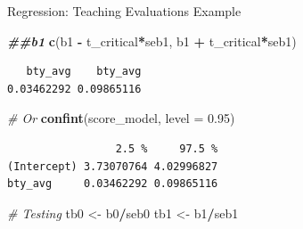 \documentclass[
  ignorenonframetext,
]{beamer}
\newenvironment{Shaded}{\begin{snugshade}}{\end{snugshade}}
\newcommand{\AttributeTok}[1]{\textcolor[rgb]{0.13,0.29,0.53}{#1}}
\newcommand{\CommentTok}[1]{\textcolor[rgb]{0.56,0.35,0.01}{\textit{#1}}}
\newcommand{\DocumentationTok}[1]{\textcolor[rgb]{0.56,0.35,0.01}{\textbf{\textit{#1}}}}
\newcommand{\FloatTok}[1]{\textcolor[rgb]{0.00,0.00,0.81}{#1}}
\newcommand{\FunctionTok}[1]{\textcolor[rgb]{0.13,0.29,0.53}{\textbf{#1}}}
\newcommand{\NormalTok}[1]{#1}
\newcommand{\OtherTok}[1]{\textcolor[rgb]{0.56,0.35,0.01}{#1}}
\newcommand{\SpecialCharTok}[1]{\textcolor[rgb]{0.81,0.36,0.00}{\textbf{#1}}}
\begin{document}
\begin{frame}[fragile]{Regression: Teaching Evaluations Example}
\protect\hypertarget{regression-teaching-evaluations-example-12}{}
\normalsize

\begin{Shaded}
\begin{Highlighting}[]
\DocumentationTok{\#\#b1}
\FunctionTok{c}\NormalTok{(b1 }\SpecialCharTok{{-}}\NormalTok{ t\_critical}\SpecialCharTok{*}\NormalTok{seb1, b1 }\SpecialCharTok{+}\NormalTok{ t\_critical}\SpecialCharTok{*}\NormalTok{seb1)}
\end{Highlighting}
\end{Shaded}

\begin{verbatim}
   bty_avg    bty_avg 
0.03462292 0.09865116 
\end{verbatim}

\begin{Shaded}
\begin{Highlighting}[]
\CommentTok{\# Or}
\FunctionTok{confint}\NormalTok{(score\_model, }\AttributeTok{level =} \FloatTok{0.95}\NormalTok{)}
\end{Highlighting}
\end{Shaded}

\begin{verbatim}
                 2.5 %     97.5 %
(Intercept) 3.73070764 4.02996827
bty_avg     0.03462292 0.09865116
\end{verbatim}

\begin{Shaded}
\begin{Highlighting}[]
\CommentTok{\# Testing}
\NormalTok{tb0 }\OtherTok{\textless{}{-}}\NormalTok{ b0}\SpecialCharTok{/}\NormalTok{seb0}
\NormalTok{tb1 }\OtherTok{\textless{}{-}}\NormalTok{ b1}\SpecialCharTok{/}\NormalTok{seb1}
\end{Highlighting}
\end{Shaded}

\normalsize
\end{frame}
\end{document}

